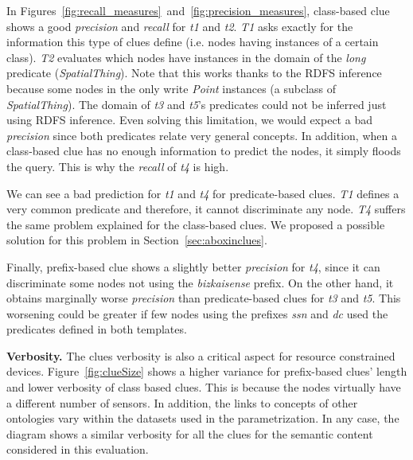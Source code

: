 In Figures~\ref{fig:recall_measures}~and~\ref{fig:precision_measures}, class-based clue shows a good \emph{precision} and \emph{recall} for \emph{t1} and \emph{t2}.
\emph{T1} asks exactly for the information this type of clues define (i.e. nodes having instances of a certain class).
\emph{T2} evaluates which nodes have instances in the domain of the \emph{long} predicate (\emph{SpatialThing}).
Note that this works thanks to the RDFS inference because some nodes in the \Space{} only write \emph{Point} instances (a subclass of \emph{SpatialThing}).
The domain of \emph{t3} and \emph{t5}'s predicates could not be inferred just using RDFS inference. %
Even solving this limitation, we would expect a bad \emph{precision} since both predicates relate very general concepts.
In addition, when a class-based clue has no enough information to predict the nodes, it simply floods the query.
This is why the \emph{recall} of \emph{t4} is high.





We can see a bad prediction for \emph{t1} and \emph{t4} for predicate-based clues.
\emph{T1} defines a very common predicate and therefore, it cannot discriminate any node.
\emph{T4} suffers the same problem explained for the class-based clues.
We proposed a possible solution for this problem in Section~\ref{sec:aboxinclues}.

Finally, prefix-based clue shows a slightly better \emph{precision} for \emph{t4}, since it can discriminate some nodes not using the \emph{bizkaisense} prefix.
On the other hand, it obtains marginally worse \emph{precision} than predicate-based clues for \emph{t3} and \emph{t5}.
This worsening could be greater if few nodes using the prefixes \emph{ssn} and \emph{dc} used the predicates defined in both templates.

\medskip

\noindent\textbf{Verbosity.}
The clues verbosity is also a critical aspect for resource constrained devices.
Figure~\ref{fig:clueSize} shows a higher variance for prefix-based clues' length and lower verbosity of class based clues.
This is because the nodes virtually have a different number of sensors.
In addition, the links to concepts of other ontologies vary within the datasets used in the parametrization.
In any case, the diagram shows a similar verbosity for all the clues for the semantic content considered in this evaluation. %


